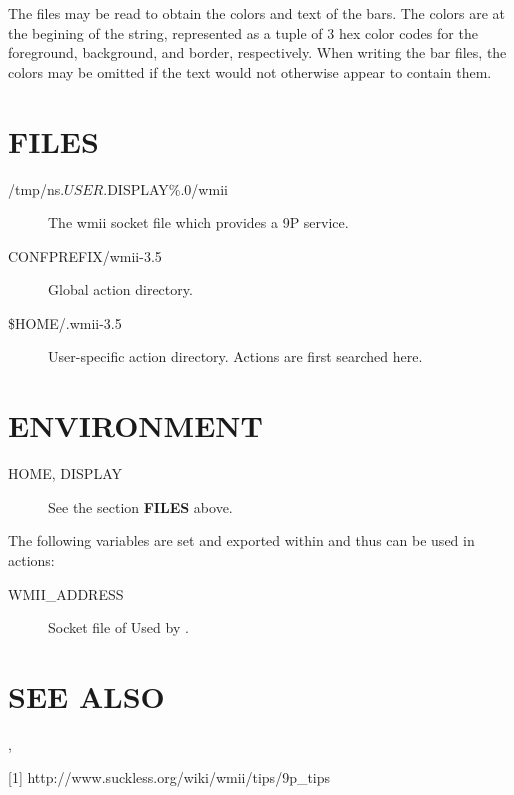 The files may be read to obtain the colors and text of the bars.
The colors are at the begining of the string, represented as a
tuple of 3 hex color codes for the foreground, background, and
border, respectively. When writing the bar files, the colors may
be omitted if the text would not otherwise appear to contain
them.

\section{FILES}

\begin{description}
\item[/tmp/ns.$USER.${DISPLAY\%.0}/wmii] The wmii socket file which provides a 9P service.
\item[CONFPREFIX/wmii-3.5] Global action directory.
\item[\$HOME/.wmii-3.5] User-specific action directory.  Actions are first searched here.
\end{description}

\section{ENVIRONMENT}

\begin{description}
\item[HOME, DISPLAY] See the section \textbf{FILES} above.
\end{description}

The following variables are set and exported within  and
thus can be used in actions:

\begin{description}
\item[WMII\_ADDRESS] Socket file of Used by .
\end{description}

\section{SEE ALSO}
, 

[1] http://www.suckless.org/wiki/wmii/tips/9p\_tips


